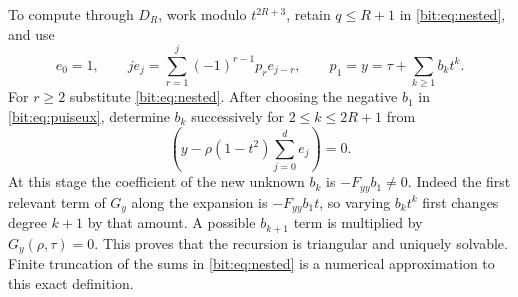 \documentclass[11pt]{article}
\theoremstyle{definition}\newtheorem{definition}[theorem]{Definition}
\theoremstyle{remark}\newtheorem{remark}[theorem]{Remark}
\begin{document}
To compute through $D_R$, work modulo $t^{2R+3}$, retain $q\le R+1$ in \eqref{bit:eq:nested}, and use
\begin{equation}
 e_0=1,\qquad
 j e_j=\sum_{r=1}^j(-1)^{r-1}p_re_{j-r},\qquad
 p_1=y=\tau+\sum_{k\ge1}b_kt^k.
 \label{bit:eq:newton}
\end{equation}
For $r\ge2$ substitute \eqref{bit:eq:nested}. After choosing the negative $b_1$ in \eqref{bit:eq:puiseux}, determine $b_k$ successively for $2\le k\le2R+1$ from
\begin{equation}
 [t^{k+1}]\left(y-\rho(1-t^2)\sum_{j=0}^de_j\right)=0.
 \label{bit:eq:triangular}
\end{equation}
At this stage the coefficient of the new unknown $b_k$ is $-F_{yy}b_1\ne0$. Indeed the first relevant term of $G_y$ along the expansion is $-F_{yy}b_1t$, so varying $b_k t^k$ first changes degree $k+1$ by that amount. A possible $b_{k+1}$ term is multiplied by $G_y(\rho,\tau)=0$. This proves that the recursion is triangular and uniquely solvable. Finite truncation of the sums in \eqref{bit:eq:nested} is a numerical approximation to this exact definition.
\end{document}
